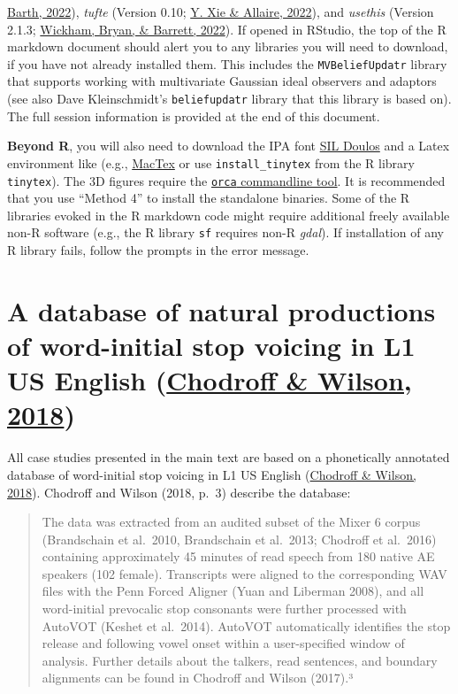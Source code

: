 \documentclass[
  11pt,
  english,
  man,floatsintext]{apa6}
\begin{document}
\protect\hyperlink{ref-R-tinylabels}{Barth, 2022}), \emph{tufte} (Version 0.10; \protect\hyperlink{ref-R-tufte}{Y. Xie \& Allaire, 2022}), and \emph{usethis} (Version 2.1.3; \protect\hyperlink{ref-R-usethis}{Wickham, Bryan, \& Barrett, 2022}). If opened in RStudio, the top of the R markdown document should alert you to any libraries you will need to download, if you have not already installed them. This includes the \texttt{MVBeliefUpdatr} library that supports working with multivariate Gaussian ideal observers and adaptors (see also Dave Kleinschmidt's \texttt{beliefupdatr} library that this library is based on). The full session information is provided at the end of this document.

\textbf{Beyond R}, you will also need to download the IPA font \href{https://software.sil.org/doulos/download/}{SIL Doulos} and a Latex environment like (e.g., \href{https://tug.org/mactex/mactex-download.html}{MacTex} or use \texttt{install\_tinytex} from the R library \texttt{tinytex}). The 3D figures require the \href{https://github.com/plotly/orca\#installation}{\texttt{orca} commandline tool}. It is recommended that you use ``Method 4'' to install the standalone binaries. Some of the R libraries evoked in the R markdown code might require additional freely available non-R software (e.g., the R library \texttt{sf} requires non-R \emph{gdal}). If installation of any R library fails, follow the prompts in the error message.

\hypertarget{sec:SI-chodroff}{%
\section{\texorpdfstring{A database of natural productions of word-initial stop voicing in L1 US English (\protect\hyperlink{ref-chodroff-wilson2018}{Chodroff \& Wilson, 2018})}{A database of natural productions of word-initial stop voicing in L1 US English (Chodroff \& Wilson, 2018)}}\label{sec:SI-chodroff}}

All case studies presented in the main text are based on a phonetically annotated database of word-initial stop voicing in L1 US English (\protect\hyperlink{ref-chodroff-wilson2018}{Chodroff \& Wilson, 2018}). Chodroff and Wilson (2018, p.~3) describe the database:

\begin{quote}
The data was extracted from an audited subset of the Mixer 6 corpus (Brandschain et al.~2010, Brandschain
et al.~2013; Chodroff et al.~2016) containing approximately 45 minutes of read speech from 180 native AE
speakers (102 female). Transcripts were aligned to the corresponding WAV files with the Penn Forced Aligner
(Yuan and Liberman 2008), and all word-initial prevocalic stop consonants were further processed with
AutoVOT (Keshet et al.~2014). AutoVOT automatically identifies the stop release and following vowel onset
within a user-specified window of analysis. Further details about the talkers, read sentences, and boundary
alignments can be found in Chodroff and Wilson (2017).³
\end{quote}
\end{document}
